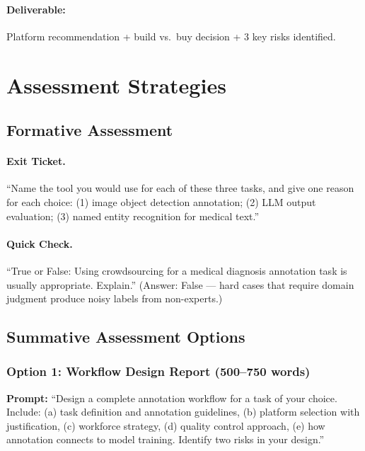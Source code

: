 \paragraph{Deliverable:} Platform recommendation + build vs.\ buy decision + 3 key risks identified.

\section{Assessment Strategies}

\subsection{Formative Assessment}

\paragraph{Exit Ticket.}
``Name the tool you would use for each of these three tasks, and give one reason for each choice: (1) image object detection annotation; (2) LLM output evaluation; (3) named entity recognition for medical text.''

\paragraph{Quick Check.}
``True or False: Using crowdsourcing for a medical diagnosis annotation task is usually appropriate. Explain.'' (Answer: False --- hard cases that require domain judgment produce noisy labels from non-experts.)

\subsection{Summative Assessment Options}

\subsubsection{Option 1: Workflow Design Report (500--750 words)}

\textbf{Prompt:} ``Design a complete annotation workflow for a task of your choice. Include: (a) task definition and annotation guidelines, (b) platform selection with justification, (c) workforce strategy, (d) quality control approach, (e) how annotation connects to model training. Identify two risks in your design.''


